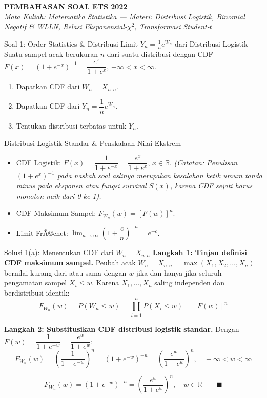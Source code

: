 \documentclass[10pt,twoside]{article}
\newcommand{\paketsoal}[2]{
  \newpage
  \markright{#1}
  \begin{center}
    {\large\bfseries #1}\\[2pt]
    {\normalsize\itshape #2}
  \end{center}
  \vspace{0.2cm}
}
\begin{document}
\paketsoal{PEMBAHASAN SOAL ETS 2022}{%
Mata Kuliah: Matematika Statistika --- Materi: Distribusi Logistik, Binomial Negatif \& WLLN, Relasi Eksponensial-$\chi^2$, Transformasi Student-$t$}

\begin{soalbox}{Soal 1: Order Statistics \& Distribusi Limit $Y_n = \frac{1}{n}e^{W_n}$ dari Distribusi Logistik}
Suatu sampel acak berukuran $n$ dari suatu distribusi dengan CDF $F(x) = (1 + e^{-x})^{-1} = \dfrac{e^x}{1 + e^x}$, $-\infty < x < \infty$.
\begin{enumerate}[label=(\alph*)]
  \item Dapatkan CDF dari $W_n = X_{n:n}$.
  \item Dapatkan CDF dari $Y_n = \dfrac{1}{n} e^{W_n}$.
  \item Tentukan distribusi terbatas untuk $Y_n$.
\end{enumerate}
\end{soalbox}

\begin{tipbox}{Distribusi Logistik Standar \& Penskalaan Nilai Ekstrem}
\begin{itemize}
  \item CDF Logistik: $F(x) = \dfrac{1}{1 + e^{-x}} = \dfrac{e^x}{1 + e^x}$, $x \in \mathbb{R}$.
  \textit{(Catatan: Penulisan $(1 + e^x)^{-1}$ pada naskah soal aslinya merupakan kesalahan ketik umum tanda minus pada eksponen atau fungsi survival $S(x)$, karena CDF sejati harus monoton naik dari 0 ke 1).}
  \item CDF Maksimum Sampel: $F_{W_n}(w) = [F(w)]^n$.
  \item Limit FrÃ©chet: $\lim_{n \to \infty} \left(1 + \dfrac{c}{n}\right)^{-n} = e^{-c}$.
\end{itemize}
\end{tipbox}

\begin{solbox}{Solusi 1(a): Menentukan CDF dari $W_n = X_{n:n}$}
\textbf{Langkah 1: Tinjau definisi CDF maksimum sampel.}
Peubah acak $W_n = X_{n:n} = \max(X_1, X_2, \dots, X_n)$ bernilai kurang dari atau sama dengan $w$ jika dan hanya jika seluruh pengamatan sampel $X_i \le w$.
Karena $X_1, \dots, X_n$ saling independen dan berdistribusi identik:
\[
F_{W_n}(w) = P(W_n \le w) = \prod_{i=1}^n P(X_i \le w) = [F(w)]^n
\]

\textbf{Langkah 2: Substitusikan CDF distribusi logistik standar.}
Dengan $F(w) = \dfrac{1}{1 + e^{-w}} = \dfrac{e^w}{1 + e^w}$:
\[
F_{W_n}(w) = \left(\frac{1}{1 + e^{-w}}\right)^n = (1 + e^{-w})^{-n} = \left(\frac{e^w}{1 + e^w}\right)^n, \quad -\infty < w < \infty
\]

\[
\boxed{F_{W_n}(w) = (1 + e^{-w})^{-n} = \left(\frac{e^w}{1 + e^w}\right)^n, \quad w \in \mathbb{R}} \qquad \blacksquare
\]
\end{solbox}
\end{document}
